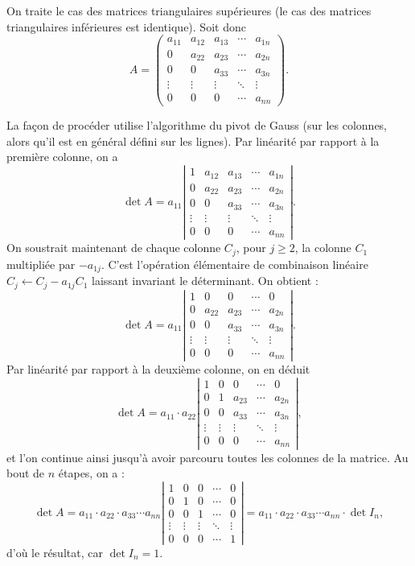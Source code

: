 \documentclass{book}
\begin{document}
\begin{Demonstration}
On traite le cas des matrices triangulaires supérieures
(le cas des matrices triangulaires inférieures est identique). Soit donc
$$A=\begin{pmatrix}
{a_{11}}&a_{12}&a_{13}&\cdots&a_{1n}\\
0&{a_{22}}&a_{23}&\cdots&a_{2n}\\
0&0&{a_{33}}&\cdots&a_{3n}\\
\vdots&\vdots&\vdots&\ddots&\vdots\\
0&0&0&\cdots&{a_{nn}}
\end{pmatrix}.
$$

La façon de procéder utilise l'algorithme du pivot de Gauss (sur les colonnes, alors qu'il est en général défini sur les lignes). Par linéarité par rapport à la première colonne, on a
$$\det A=a_{11}\left|\begin{matrix}
1&a_{12}&a_{13}&\cdots&a_{1n}\\
0&{a_{22}}&a_{23}&\cdots&a_{2n}\\
0&0&{a_{33}}&\cdots&a_{3n}\\
\vdots&\vdots&\vdots&\ddots&\vdots\\
0&0&0&\cdots&{a_{nn}}
\end{matrix}\right|.$$
On soustrait maintenant de chaque colonne $C_j$, pour $j\ge 2$, la colonne $C_1$ multipliée
par $-a_{1j}$.
C'est l'opération élémentaire de combinaison linéaire $C_j \leftarrow C_j - a_{1j}C_1$ laissant invariant le déterminant. On obtient :
$$\det A=a_{11}\left|\begin{matrix}
1&0&0&\cdots&0\\
0&{a_{22}}&a_{23}&\cdots&a_{2n}\\
0&0&{a_{33}}&\cdots&a_{3n}\\
\vdots&\vdots&\vdots&\ddots&\vdots\\
0&0&0&\cdots&{a_{nn}}
\end{matrix}\right|.$$
Par linéarité par rapport à la deuxième colonne, on en déduit
$$\det A=a_{11} \cdot a_{22}\left|\begin{matrix}
1&0&0&\cdots&0\\
0&1&a_{23}&\cdots&a_{2n}\\
0&0&{a_{33}}&\cdots&a_{3n}\\
\vdots&\vdots&\vdots&\ddots&\vdots\\
0&0&0&\cdots&{a_{nn}}
\end{matrix}\right|,$$
et l'on continue ainsi jusqu'à avoir parcouru toutes les colonnes de la matrice. Au bout de $n$ étapes, on a :
$$\det A=a_{11} \cdot a_{22} \cdot a_{33}\cdots{a_{nn}}\left|\begin{matrix}
1&0&0&\cdots&0\\
0&1&0&\cdots&0\\
0&0&1&\cdots&0\\
\vdots&\vdots&\vdots&\ddots&\vdots\\
0&0&0&\cdots&1
\end{matrix}\right|=
a_{11} \cdot a_{22} \cdot a_{33}\cdots{a_{nn}} \cdot \det I_n,$$
d'où le résultat, car $\det I_n = 1$.
\end{Demonstration}
\end{document}

